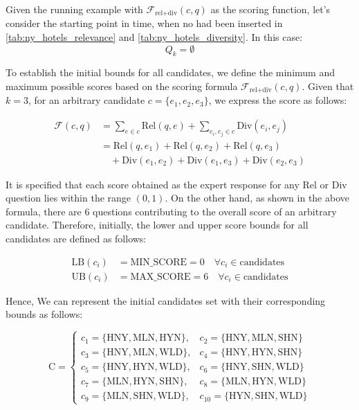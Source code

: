 \begin{example}
Given the running example with $\mathcal{F}_{\text{rel+div}}(c, q)$ as the scoring function, let's consider the starting point in time, when no had been inserted in \autoref{tab:ny_hotels_relevance} and \autoref{tab:ny_hotels_diversity}. In this case:
\[
Q_k = \emptyset
\]

To establish the initial bounds for all candidates, we define the minimum and maximum possible scores based on the scoring formula \(\mathcal{F}_{\text{rel+div}}(c, q)\). Given that \(k = 3\), for an arbitrary candidate \(c = \{e_1, e_2, e_3\}\), we express the score as follows:

\begin{align*}
\mathcal{F}(c, q) &= \sum_{e \in c} \text{Rel}(q, e) + \sum_{e_i, e_j \in c} \text{Div}(e_i, e_j) \\
&= \text{Rel}(q, e_1) + \text{Rel}(q, e_2) + \text{Rel}(q, e_3) \\
&\quad + \text{Div}(e_1, e_2) + \text{Div}(e_1, e_3) + \text{Div}(e_2, e_3)
\end{align*}

It is specified that each score obtained as the expert response for any \(\text{Rel}\) or \(\text{Div}\) question lies within the range \((0, 1)\). On the other hand, as shown in the above formula, there are 6 questions contributing to the overall score of an arbitrary candidate. Therefore, initially, the lower and upper score bounds for all candidates are defined as follows:

\begin{align*}
\text{LB}(c_i) &= \text{MIN\_SCORE} = 0 \quad \forall c_i \in \text{candidates} \\
\text{UB}(c_i) &= \text{MAX\_SCORE} = 6 \quad \forall c_i \in \text{candidates}
\end{align*}

Hence, We can represent the initial candidates set with their corresponding bounds as follows:

\[
    \text{C} = 
    \begin{cases}
    c_1 = \{ \text{HNY}, \text{MLN}, \text{HYN} \}, & c_2 = \{ \text{HNY}, \text{MLN}, \text{SHN} \} \\
    c_3 = \{ \text{HNY}, \text{MLN}, \text{WLD} \}, & c_4 = \{ \text{HNY}, \text{HYN}, \text{SHN} \} \\
    c_5 = \{ \text{HNY}, \text{HYN}, \text{WLD} \}, & c_6 = \{ \text{HNY}, \text{SHN}, \text{WLD} \} \\
    c_7 = \{ \text{MLN}, \text{HYN}, \text{SHN} \}, & c_8 = \{ \text{MLN}, \text{HYN}, \text{WLD} \} \\
    c_9 = \{ \text{MLN}, \text{SHN}, \text{WLD} \}, & c_{10} = \{ \text{HYN}, \text{SHN}, \text{WLD} \} 
    \end{cases}
\]


\end{example}
